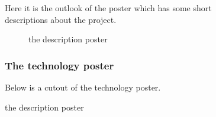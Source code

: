 \begin{figure}[!hbtp]

Here it is the outlook of the poster which has some short descriptions about the project.

\begin{figure}[!h]

  \centering
  \caption{the description poster}
  \label{fig:poster_describing}
\end{figure}

\pagebreak

\subsubsection{The technology poster}

Below is a cutout of the technology poster.


\end{figure}

